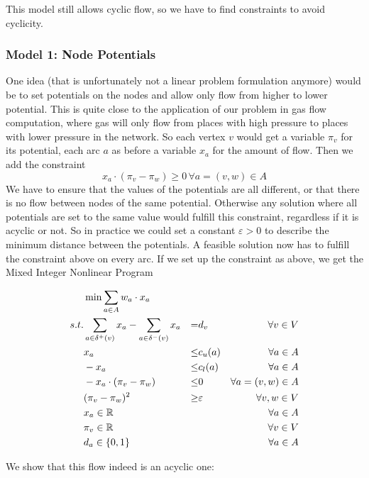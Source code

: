 This model still allows cyclic flow, so we have to find constraints to avoid cyclicity. 
\subsubsection{Model 1: Node Potentials}

One idea (that is unfortunately not a linear problem formulation anymore) would be to set potentials on the nodes and 
allow only flow from higher to lower potential. This is quite close to the application of our problem in gas flow 
computation, where gas will only flow from places with high pressure to places with lower pressure in the network. So 
each vertex $v$ would get a variable $\pi_v$ for its potential, each arc $a$ as before a variable $x_a$ for the amount 
of flow. Then we add the constraint $$x_a\cdot (\pi_v -\pi_w)\ge 0\,\forall a=(v,w)\in A $$
We have to ensure that the values of the potentials are all 
different, or that there is no flow between nodes of the same potential. Otherwise any solution where all potentials 
are set to the same value would fulfill this constraint, regardless if it is acyclic or not. So in practice we could 
set a constant $\varepsilon > 0$ to describe the minimum distance between the potentials. A feasible 
solution now has to fulfill the constraint above on every arc. If we set up the constraint as above, we get the Mixed 
Integer Nonlinear Program

\begin{align*}
  &\min \sum_{a\in A} w_a\cdot x_a & \\
 s.t. & \sum_{a\in \delta^+(v)}x_a - \sum_{a\in\delta^- (v)}x_a &=& d_v\ &\forall v\in V \\
 & x_a &\le& c_u(a) & \forall a\in A\\
 & -x_a &\le& c_l(a) & \forall a\in A\\
 & -x_a\cdot (\pi_v -\pi_w)&\le& 0 &\forall a=(v,w)\in A\\
 & (\pi_v - \pi_w)^2 &\ge& \varepsilon &\forall v,w \in V\\
 & x_a \in \mathbb{R} & & &\forall a\in A\\
 & \pi_v \in \mathbb{R} & & & \forall v\in V\\
 & d_a \in \{0,1\} & & &\forall a\in A\\
\end{align*}

We show that this flow indeed is an acyclic one:

